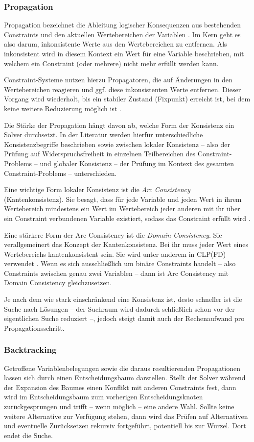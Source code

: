 \documentclass[12pt,a4paper]{article}
\begin{document}
\subsubsection{Propagation}
Propagation bezeichnet die Ableitung logischer Konsequenzen aus bestehenden Constraints und den aktuellen Wertebereichen der Variablen \cite{clp92}.
Im Kern geht es also darum, inkonsistente Werte aus den Wertebereichen zu entfernen.
Als \glqq inkonsistent\grqq{} wird in diesem Kontext ein Wert für eine Variable beschrieben, mit welchem ein Constraint (oder mehrere) nicht mehr erfüllt werden kann.

Constraint-Systeme nutzen hierzu Propagatoren, die auf Änderungen in den Wertebereichen reagieren und ggf. diese inkonsistenten Werte entfernen.
Dieser Vorgang wird wiederholt, bis ein stabiler Zustand (Fixpunkt) erreicht ist, bei dem keine weitere Reduzierung möglich ist \cite{clp_handbook}.

Die Stärke der Propagation hängt davon ab, welche Form der Konsistenz ein Solver durchsetzt.
In der Literatur werden hierfür unterschiedliche Konsistenzbegriffe beschrieben sowie zwischen lokaler Konsistenz -- also der Prüfung auf Widerspruchsfreiheit in einzelnen Teilbereichen des Constraint-Problems -- und globaler Konsistenz -- der Prüfung im Kontext des gesamten Constraint-Problems -- unterschieden.

Eine wichtige Form lokaler Konsistenz ist die \emph{Arc Consistency} (Kantenkonsistenz).
Sie besagt, dass für jede Variable und jeden Wert in ihrem Wertebereich mindestens ein Wert im Wertebereich jeder anderen mit ihr über ein Constraint verbundenen Variable existiert, sodass das Constraint erfüllt wird \cite{clp_handbook}.

Eine stärkere Form der Arc Consistency ist die \emph{Domain Consistency}. Sie verallgemeinert das Konzept der Kantenkonsistenz.
Bei ihr muss jeder Wert eines Wertebereichs kantenkonsistent sein. Sie wird unter anderem in CLP(FD) verwendet \cite{drt}.
Wenn es sich ausschließlich um binäre Constraints handelt -- also Constraints zwischen genau zwei Variablen -- dann ist Arc Consistency mit Domain Consistency gleichzusetzen.

Je nach dem wie stark einschränkend eine Konsistenz ist, desto schneller ist die Suche nach Lösungen -- der Suchraum wird dadurch schließlich schon vor der eigentlichen Suche reduziert --, jedoch steigt damit auch der Rechenaufwand pro Propagationsschritt.
\subsubsection{Backtracking}
\label{sec:backtracking}
Getroffene Variablenbelegungen sowie die daraus resultierenden Propagationen lassen sich durch einen Entscheidungsbaum darstellen.
Stellt der Solver während der Expansion des Baumes einen Konflikt mit anderen Constraints fest, dann wird im Entscheidungsbaum zum vorherigen Entscheidungsknoten zurückgesprungen und trifft -- wenn möglich -- eine andere Wahl.
Sollte keine weitere Alternative zur Verfügung stehen, dann wird das Prüfen auf Alternativen und eventuelle Zurücksetzen rekursiv fortgeführt, potentiell bis zur Wurzel.
Dort endet die Suche.
\end{document}
